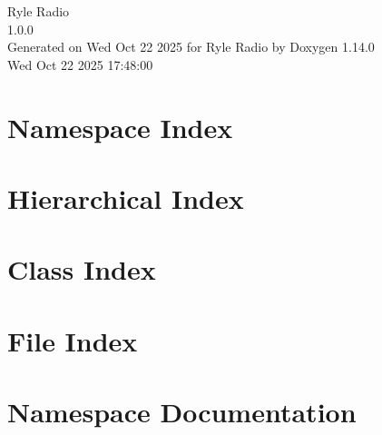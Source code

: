 \documentclass[twoside]{book}
\newcommand{\+}{\discretionary{\mbox{\scriptsize$\hookleftarrow$}}{}{}}
\newcommand{\clearemptydoublepage}{%
    \newpage{\pagestyle{empty}\cleardoublepage}%
  }
\begin{document}
  \raggedbottom
    \hypersetup{pageanchor=false,
                bookmarksnumbered=true,
                pdfencoding=unicode
               }
  \begin{titlepage}
  \vspace*{7cm}
  \begin{center}%
  {\Large Ryle Radio}\\
  [1ex]\large 1.\+0.\+0 \\
  \vspace*{1cm}
  {\large Generated on Wed Oct 22 2025 for Ryle Radio by Doxygen 1.14.0}\\
    \vspace*{0.5cm}
    {\small Wed Oct 22 2025 17:48:00}
  \end{center}
  \end{titlepage}
  \clearemptydoublepage
  \tableofcontents
  \clearemptydoublepage
  \hypersetup{pageanchor=true}
\chapter{Namespace Index}

\chapter{Hierarchical Index}

\chapter{Class Index}

\chapter{File Index}

\chapter{Namespace Documentation}





\end{document}
